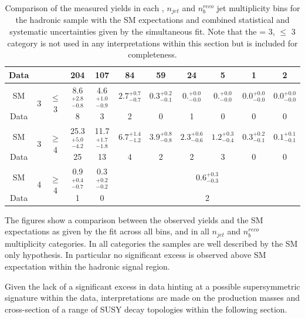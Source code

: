 \begin{table}[h!]
\begin{center}
\begin{tabular*}{1.0\textwidth}{@{\extracolsep{\fill}}ccccccccccc}
Data &  &  & 204 & 107 & 84 & 59 & 24 & 5 & 1 & 2 \\
\hline
SM & \multicolumn{1}{c}{\multirow{2}{*}{3}} & \multicolumn{1}{c}{\multirow{2}{*}{$\leq$ 3}} & 8.6$^{+2.8}_{-0.8}$ & 4.6$^{+1.0}_{-0.9}$ & $2.7^{+0.7}_{-0.7}$& $0.3^{+0.2}_{-0.1}$ & $0.^{+0.0}_{-0.0}$ & $0.^{+0.0}_{-0.0}$ & $0.0^{+0.0}_{-0.0}$ & $0.0^{+0.0}_{-0.0}$ \\
Data &  &  & 8 & 3 & 2 & 0 & 1 & 0 & 0 & 0 \\
\hline
SM & \multicolumn{1}{c}{\multirow{2}{*}{3}} & \multicolumn{1}{c}{\multirow{2}{*}{$\geq$ 4}} & 25.3$^{+5.0}_{-4.2}$ & 11.7$^{+1.7}_{-1.8}$ & $6.7^{+1.4}_{-1.2}$& $3.9^{+0.8}_{-0.8}$ & $2.3^{+0.6}_{-0.6}$ & $1.2^{+0.3}_{-0.4}$ & $0.3^{+0.2}_{-0.1}$ & $0.1^{+0.1}_{-0.1}$ \\
Data &  &  & 25 & 13 & 4 & 2 & 2 & 3 & 0 & 0 \\
\hline
SM & \multicolumn{1}{c}{\multirow{2}{*}{4}} & \multicolumn{1}{c}{\multirow{2}{*}{$\geq$ 4}} & 0.9$^{+0.4}_{-0.7}$ & 0.3$^{+0.2}_{-0.2}$ & \multicolumn{6}{c}{$0.6^{+0.3}_{-0.3}$} \\
Data &  &  & 1 & 0 & \multicolumn{6}{c}{2} \\
\hline
\end{tabular*}
\end{center}
\caption[Comparison of the measured yields in each \theht, $n_{jet}$ and $n_{b}^{reco}$ jet multiplicity bins for the hadronic sample with the \ac{SM} expectations and combined statistical and systematic uncertainties given by the simultaneous fit.]{Comparison of the measured yields in each \theht, $n_{jet}$ and $n_{b}^{reco}$ jet multiplicity bins for the hadronic sample with the \ac{SM} expectations and combined statistical and systematic uncertainties given by the simultaneous fit. Note that the \nbreco = 3, \njet $\leq$ 3 category is not used in any interpretations within this section but is included for completeness.}\label{tab:fitsdata}
\end{table}

The figures show a comparison between the observed yields and the \ac{SM} expectations as given by the fit across all \theht bins, and in all $n_{jet}$ and $n_{b}^{reco}$ multiplicity categories. In all categories the samples are well described by the \ac{SM} only hypothesis. In particular no significant excess is observed above \ac{SM} expectation within the hadronic signal region. 

Given the lack of a significant excess in data hinting at a possible supersymmetric signature within the data, interpretations are made on the production masses and cross-section of a range of \ac{SUSY} decay topologies within the following section.

